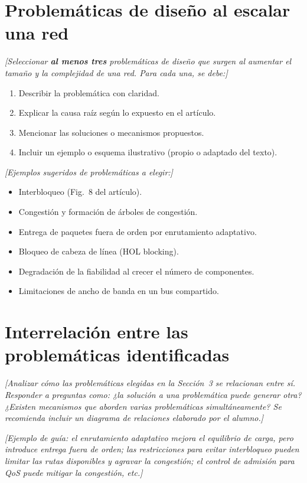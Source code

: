 \documentclass[12pt,a4paper]{article}
\begin{document}
\section{Problemáticas de diseño al escalar una red}
\textit{[Seleccionar \textbf{al menos tres} problemáticas de diseño que surgen al aumentar el tamaño y la complejidad de una red. Para cada una, se debe:]}
\begin{enumerate}
    \item Describir la problemática con claridad.
    \item Explicar la causa raíz según lo expuesto en el artículo.
    \item Mencionar las soluciones o mecanismos propuestos.
    \item Incluir un ejemplo o esquema ilustrativo (propio o adaptado del texto).
\end{enumerate}

\textit{[Ejemplos sugeridos de problemáticas a elegir:]}
\begin{itemize}
    \item Interbloqueo (Fig.~8 del artículo).
    \item Congestión y formación de árboles de congestión.
    \item Entrega de paquetes fuera de orden por enrutamiento adaptativo.
    \item Bloqueo de cabeza de línea (HOL blocking).
    \item Degradación de la fiabilidad al crecer el número de componentes.
    \item Limitaciones de ancho de banda en un bus compartido.
\end{itemize}

\section{Interrelación entre las problemáticas identificadas}
\textit{[Analizar cómo las problemáticas elegidas en la Sección~3 se relacionan entre sí. Responder a preguntas como: ¿la solución a una problemática puede generar otra? ¿Existen mecanismos que aborden varias problemáticas simultáneamente? Se recomienda incluir un diagrama de relaciones elaborado por el alumno.]}

\textit{[Ejemplo de guía: el enrutamiento adaptativo mejora el equilibrio de carga, pero introduce entrega fuera de orden; las restricciones para evitar interbloqueo pueden limitar las rutas disponibles y agravar la congestión; el control de admisión para QoS puede mitigar la congestión, etc.]}
\end{document}
